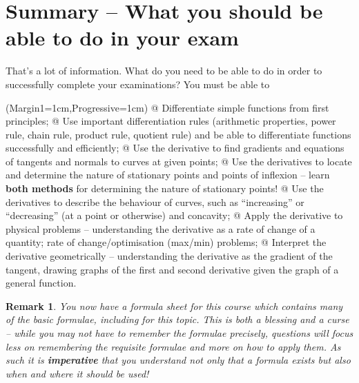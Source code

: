\documentclass[a4paper,11pt]{article}
\newtheorem*{remark}{Remark}
\begin{document}
\section{Summary -- What you should be able to do in your exam}
That's a lot of information. What do you need to be able to do in order to successfully complete your examinations? You must be able to
\vspace{0.15cm}
\begin{easylist}[itemize]
	\ListProperties(Margin1=1cm,Progressive=1cm)
	@ Differentiate simple functions from first principles;
	@ Use important differentiation rules (arithmetic properties, power rule, chain rule, product rule, quotient rule) and be able to differentiate functions successfully and efficiently;
	@ Use the derivative to find gradients and equations of tangents and normals to curves at given points;
	@ Use the derivatives to locate and determine the nature of stationary points and points of inflexion -- learn \textbf{both methods} for determining the nature of stationary points!
	@ Use the derivatives to describe the behaviour of curves, such as ``increasing'' or ``decreasing'' (at a point or otherwise) and concavity;
	@ Apply the derivative to physical problems -- understanding the derivative as a rate of change of a quantity; rate of change/optimisation (max/min) problems;
	@ Interpret the derivative geometrically -- understanding the derivative as the gradient of the tangent, drawing graphs of the first and second derivative given the graph of a general function.
\end{easylist}
\vspace{0.15cm}
\begin{remark}\normalfont
	You now have a formula sheet for this course which contains many of the basic formulae, including for this topic. This is both a blessing and a curse -- while you may not have to remember the formulae precisely, questions will focus less on remembering the requisite formulae and more on how to apply them. As such it is \textbf{imperative} that you understand not only that a formula exists but also when and where it should be used!
\end{remark}
\end{document}
